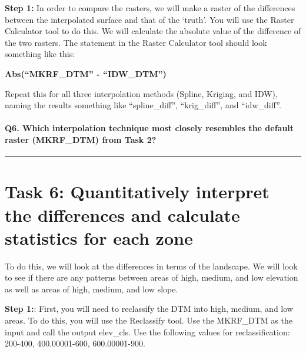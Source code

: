 \documentclass[
]{book}
\begin{document}
\textbf{Step 1:} In order to compare the rasters, we will make a raster of the differences between the interpolated surface and that of the `truth'. You will use the Raster Calculator tool to do this. We will calculate the absolute value of the difference of the two rasters. The statement in the Raster Calculator tool should look something like this:

\textbf{Abs(``MKRF\_DTM'' - ``IDW\_DTM'')}

Repeat this for all three interpolation methods (Spline, Kriging, and IDW), naming the results something like ``spline\_diff'', ``krig\_diff'', and ``idw\_diff''.

\hypertarget{q6.-which-interpolation-technique-most-closely-resembles-the-default-raster-mkrf_dtm-from-task-2}{%
\paragraph*{Q6. Which interpolation technique most closely resembles the default raster (MKRF\_DTM) from Task 2?}\label{q6.-which-interpolation-technique-most-closely-resembles-the-default-raster-mkrf_dtm-from-task-2}}

\begin{center}\rule{0.5\linewidth}{0.5pt}\end{center}

\hypertarget{task-6-quantitatively-interpret-the-differences-and-calculate-statistics-for-each-zone}{%
\section*{Task 6: Quantitatively interpret the differences and calculate statistics for each zone}\label{task-6-quantitatively-interpret-the-differences-and-calculate-statistics-for-each-zone}}

To do this, we will look at the differences in terms of the landscape. We will look to see if there are any patterns between areas of high, medium, and low elevation as well as areas of high, medium, and low slope.

\textbf{Step 1:}: First, you will need to reclassify the DTM into high, medium, and low areas. To do this, you will use the Reclassify tool. Use the MKRF\_DTM as the input and call the output elev\_cls. Use the following values for reclassification: 200-400, 400.00001-600, 600.00001-900.
\end{document}
